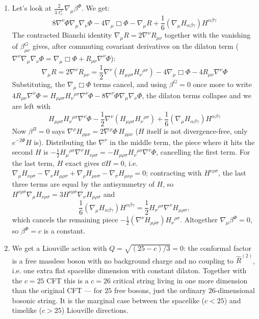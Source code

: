 \documentclass[11pt, class=article, crop=false]{standalone}
\begin{document}
\begin{enumerate}
	\item Let's look at $\frac{2}{3 \ell_s^2} \nabla_\mu \beta^\Phi$. We get:
	\[
		8 \nabla^\nu \Phi \nabla_\mu \nabla_{\nu} \Phi - 4 \nabla_\mu \Box \Phi - \nabla_\mu R + \frac16 (\nabla_\mu H_{\alpha \beta \gamma}) H^{\alpha \beta \gamma}
	\]
	The contracted Bianchi identity $\nabla_\mu R = 2 \nabla^\nu R_{\mu \nu}$ together with the vanishing of $\beta^G_{\mu \nu}$ gives, after commuting covariant derivatives on the dilaton term ($\nabla^\nu \nabla_\mu \nabla_\nu \Phi = \nabla_\mu \Box \Phi + R_{\mu \nu} \nabla^\nu \Phi$):
	\[
		\nabla_\mu R = 2 \nabla^\nu R_{\mu \nu} = \frac12 \nabla^\nu (H_{\mu \rho \sigma} H_{\nu}{}^{\rho \sigma}) - 4 \nabla_\mu \Box \Phi - 4 R_{\mu \nu} \nabla^\nu \Phi
	\]
	Substituting, the $\nabla_\mu \Box \Phi$ terms cancel, and using $\beta^G = 0$ once more to write $4 R_{\mu \nu} \nabla^\nu \Phi = H_{\mu \rho \sigma} H_\nu{}^{\rho \sigma} \nabla^\nu \Phi - 8 \nabla^\nu \Phi \nabla_\mu \nabla_\nu \Phi$, the dilaton terms collapse and we are left with
	\[
		H_{\mu \rho \sigma} H_\nu{}^{\rho \sigma} \nabla^\nu \Phi - \frac12 \nabla^\nu (H_{\mu \rho \sigma} H_{\nu}{}^{\rho \sigma}) + \frac16 (\nabla_\mu H_{\alpha \beta \gamma}) H^{\alpha \beta \gamma}
	\]
	Now $\beta^B = 0$ says $\nabla^\rho H_{\rho \mu \nu} = 2 \nabla^\rho \Phi\, H_{\rho \mu \nu}$ ($H$ itself is not divergence-free, only $e^{-2\Phi} H$ is). Distributing the $\nabla^\nu$ in the middle term, the piece where it hits the second $H$ is $-\frac12 H_\mu{}^{\rho \sigma} \nabla^\nu H_{\nu \rho \sigma} = - H_{\mu \rho \sigma} H_\nu{}^{\rho \sigma} \nabla^\nu \Phi$, cancelling the first term. For the last term, $H$ exact gives $\dd H = 0$, i.e. $\nabla_\mu H_{\nu \rho \sigma} - \nabla_\nu H_{\mu \rho \sigma} + \nabla_\rho H_{\mu \nu \sigma} - \nabla_\sigma H_{\mu \nu \rho} = 0$; contracting with $H^{\nu \rho \sigma}$, the last three terms are equal by the antisymmetry of $H$, so $H^{\nu \rho \sigma} \nabla_\mu H_{\nu \rho \sigma} = 3 H^{\nu \rho \sigma} \nabla_\nu H_{\mu \rho \sigma}$ and
	\[
		\frac16 (\nabla_\mu H_{\alpha \beta \gamma}) H^{\alpha \beta \gamma} = \frac12 H_\nu{}^{\rho \sigma} \nabla^\nu H_{\mu \rho \sigma},
	\]
	which cancels the remaining piece $-\frac12 (\nabla^\nu H_{\mu \rho \sigma}) H_\nu{}^{\rho \sigma}$. Altogether $\nabla_\mu \beta^\Phi = 0$, so $\beta^\Phi = c$ is a constant.
	
	
	\item We get a Liouville action with $Q = \sqrt{(25-c)/3} = 0$: the conformal factor is a free massless boson with no background charge and no coupling to $\hat R^{(2)}$, i.e. one extra flat spacelike dimension with constant dilaton. Together with the $c = 25$ CFT this is a $c = 26$ critical string living in one more dimension than the original CFT --- for $25$ free bosons, just the ordinary $26$-dimensional bosonic string. It is the marginal case between the spacelike ($c < 25$) and timelike ($c > 25$) Liouville directions.
	

\end{enumerate}
\end{document}
